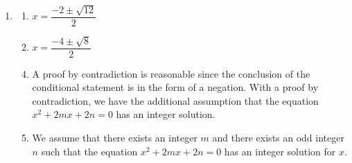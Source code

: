 \begin{enumerate}
\item \begin{multicols}{2}
\begin{enumerate}
\item $x = \dfrac{{ - 2 \pm \sqrt {12} }}{2}$

\item $x = \dfrac{{ - 4 \pm \sqrt 8 }}{2}$

\end{enumerate}
\end{multicols}

\begin{enumerate} \setcounter{enumii}{3}
\item A proof by contradiction is reasonable since the conclusion of the conditional statement is in the form of a negation.  With a proof by contradiction, we have the additional assumption that the equation $x^2  + 2mx + 2n = 0$ has an integer solution.

\item We assume that there exists an integer  $m$  and there exists an odd integer $n$  such that the equation $x^2  + 2mx + 2n = 0$ has an integer solution for  $x$.


\end{enumerate}
\end{enumerate}
